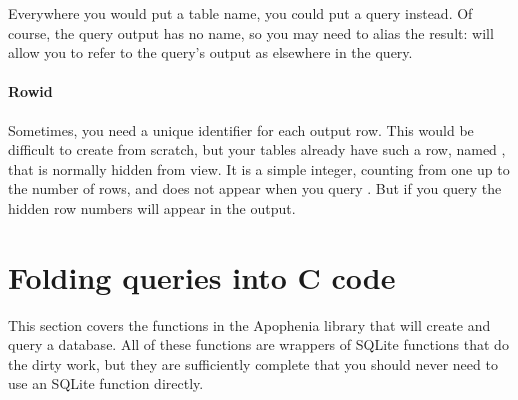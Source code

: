 Everywhere you would put a table name, you could put a query 
instead. Of course, the query output has no name, so you may need to
alias the result:  will allow you to refer to
the query's output as  elsewhere in the query.

\paragraph{Rowid} Sometimes, you need a unique identifier for each
output row. This would be difficult to create from scratch, but your
tables already have such a row, named , that is normally
hidden from view. It is a simple integer, counting from one up to the
number of rows, and does not appear when you query . But if you query 
the hidden row numbers will appear in the output.


\section{Folding queries into C code}\label{foldingsql}  This section covers the functions
in the Apophenia library that will create and query a database. All of
these functions are wrappers of SQLite functions that do the dirty work,
but they are sufficiently complete that you should never need to use an
SQLite function directly.

